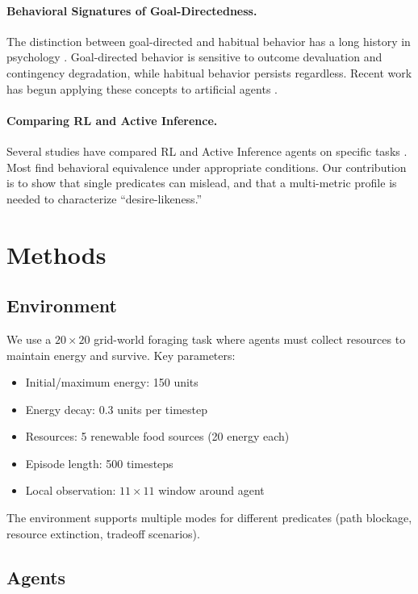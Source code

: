 \documentclass{article}
\begin{document}
\paragraph{Behavioral Signatures of Goal-Directedness.} The distinction between goal-directed and habitual behavior has a long history in psychology \cite{dickinson1985actions}. Goal-directed behavior is sensitive to outcome devaluation and contingency degradation, while habitual behavior persists regardless. Recent work has begun applying these concepts to artificial agents \cite{langdon2022model}.

\paragraph{Comparing RL and Active Inference.} Several studies have compared RL and Active Inference agents on specific tasks \cite{millidge2020relationship, tschantz2020reinforcement}. Most find behavioral equivalence under appropriate conditions. Our contribution is to show that single predicates can mislead, and that a multi-metric profile is needed to characterize ``desire-likeness.''

\section{Methods}

\subsection{Environment}

We use a $20 \times 20$ grid-world foraging task where agents must collect resources to maintain energy and survive. Key parameters:
\begin{itemize}
    \item Initial/maximum energy: 150 units
    \item Energy decay: 0.3 units per timestep
    \item Resources: 5 renewable food sources (20 energy each)
    \item Episode length: 500 timesteps
    \item Local observation: $11 \times 11$ window around agent
\end{itemize}

The environment supports multiple modes for different predicates (path blockage, resource extinction, tradeoff scenarios).

\subsection{Agents}
\end{document}
